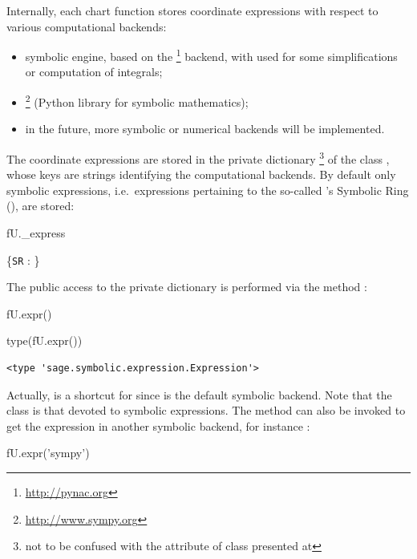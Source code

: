Internally, each chart function stores coordinate expressions with respect
to various computational backends:
\begin{itemize}
\item \Sage{} symbolic engine, based on the \footnote{\url{http://pynac.org}} backend, with  used for some simplifications
or computation of integrals;
\item {}\footnote{\url{http://www.sympy.org}} (Python library for symbolic mathematics);
\item in the future, more symbolic or numerical backends will be implemented.
\end{itemize}
The coordinate expressions are stored in the private dictionary \footnote{not to be confused with
the attribute  of class  presented
at }
of the class ,
whose keys are strings identifying the computational backends. By default
only \Sage{} symbolic expressions, i.e.\ expressions pertaining
to the so-called \Sage{}'s Symbolic Ring (),
are stored:
\begin{NBin}
fU._express
\end{NBin}
\begin{NBoutM}
\left\{\verb|SR| : \right\}
\end{NBoutM}
The public access to the private dictionary  is performed via the
method :
\begin{NBin}
fU.expr()
\end{NBin}
\begin{NBoutM}
\end{NBoutM}
\begin{NBin}
type(fU.expr())
\end{NBin}
\begin{NBout}
\begin{verbatim}
<type 'sage.symbolic.expression.Expression'>
\end{verbatim}
\end{NBout}
Actually,  is a shortcut for  since
 is the default symbolic backend. Note that the class
 is that devoted to \Sage{} symbolic expressions.
The method  can also be invoked to get the expression in
another symbolic backend, for instance :
\begin{NBin}
fU.expr('sympy')
\end{NBin}
